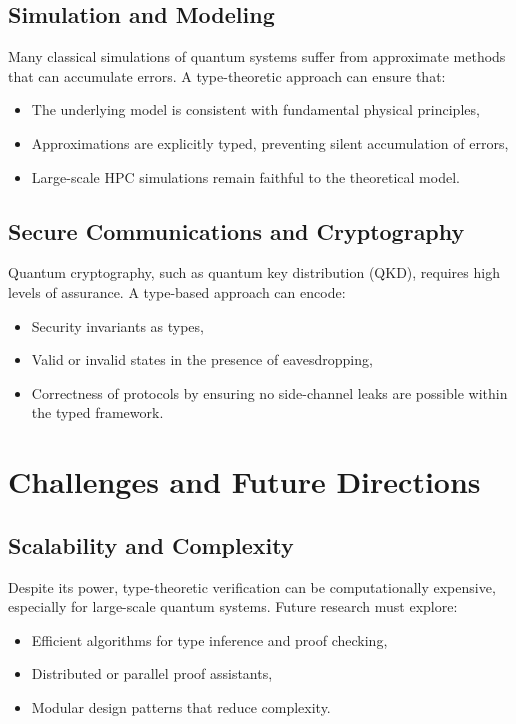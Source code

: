 \documentclass[12pt]{article}
\begin{document}
\subsection{Simulation and Modeling}
Many classical simulations of quantum systems suffer from approximate methods that can accumulate errors. A type-theoretic approach can ensure that:
\begin{itemize}[label=$\bullet$]
    \item The underlying model is consistent with fundamental physical principles,
    \item Approximations are explicitly typed, preventing silent accumulation of errors,
    \item Large-scale HPC simulations remain faithful to the theoretical model.
\end{itemize}

\subsection{Secure Communications and Cryptography}
Quantum cryptography, such as quantum key distribution (QKD), requires high levels of assurance. A type-based approach can encode:
\begin{itemize}[label=$\bullet$]
    \item Security invariants as types,
    \item Valid or invalid states in the presence of eavesdropping,
    \item Correctness of protocols by ensuring no side-channel leaks are possible within the typed framework.
\end{itemize}

\section{Challenges and Future Directions}
\label{sec:future_challenges}

\subsection{Scalability and Complexity}
Despite its power, type-theoretic verification can be computationally expensive, especially for large-scale quantum systems. Future research must explore:
\begin{itemize}[label=$\bullet$]
    \item Efficient algorithms for type inference and proof checking,
    \item Distributed or parallel proof assistants,
    \item Modular design patterns that reduce complexity.
\end{itemize}
\end{document}
